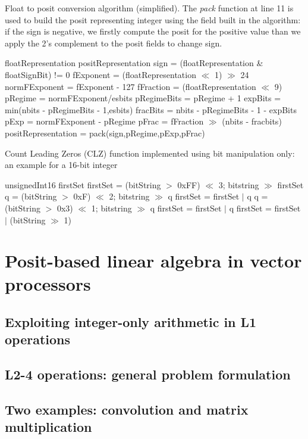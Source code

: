 \begin{algorithm}
 \caption{Float to posit conversion algorithm (simplified). The \textit{pack} function at line 11 is used to build the posit representing integer using the field built in the algorithm: if the sign is negative, we firstly compute the posit for the positive value than we apply the 2's complement to the posit fields to change sign.}
 \label{alg:positenc}
 \begin{algorithmic}[1]
 \renewcommand{\algorithmicrequire}{\textbf{Input:}}
 \renewcommand{\algorithmicensure}{\textbf{Output:}}
 \Require floatRepresentation
 \Ensure positRepresentation
\State sign = (floatRepresentation \& floatSignBit) != 0
\State fExponent = (floatRepresentation $\ll$ 1) $\gg$ 24
\State normFExponent = fExponent - 127
\State fFraction = (floatRepresentation $\ll$ 9) 
\State pRegime = normFExponent/esbits
\State pRegimeBits = pRegime + 1
\State expBits = min(nbits - pRegimeBits - 1,esbits)
\State fracBits = nbits - pRegimeBits - 1 - expBits
\State pExp = normFExponent - pRegime 
\State pFrac = fFraction $\gg$ (nbits - fracbits)
\State positRepresentation = pack(sign,pRegime,pExp,pFrac)
\end{algorithmic} 
\end{algorithm}

\begin{algorithm}
 \caption{ Count Leading Zeros (CLZ) function implemented using bit manipulation only: an example for a 16-bit integer}
 \label{alg:clz}
 \begin{algorithmic}[1]
   \renewcommand{\algorithmicrequire}{\textbf{Input:}}
 \renewcommand{\algorithmicensure}{\textbf{Output:}}
 \Require unsignedInt16
 \Ensure firstSet
  \State firstSet = (bitString $>$ 0xFF) $\ll$ 3; bitstring $\gg$ firstSet
  \State q = (bitString $>$ 0xF) $\ll$ 2; bitstring $\gg$ q
  \State firstSet = firstSet $|$ q
  \State q = (bitString $>$ 0x3) $\ll$ 1; bitstring $\gg$ q
  \State firstSet = firstSet $|$ q
  \State firstSet = firstSet $|$ (bitString $\gg$ 1)
 \end{algorithmic}
\end{algorithm}

\section{Posit-based linear algebra in vector processors}
\subsection{Exploiting integer-only arithmetic in L1 operations}
\subsection{L2-4 operations: general problem formulation}
\subsection{Two examples: convolution and matrix multiplication}


